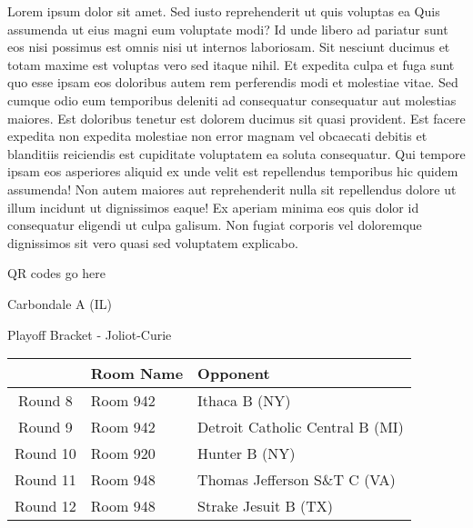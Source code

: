 \documentclass{article}%
\begin{document}
\vspace*{8pt}%
\linebreak%
\newline%
\newline%
Lorem ipsum dolor sit amet. Sed iusto reprehenderit ut quis voluptas ea Quis assumenda ut eius magni eum voluptate modi? Id unde libero ad pariatur sunt eos nisi possimus est omnis nisi ut internos laboriosam. Sit nesciunt ducimus et totam maxime est voluptas vero sed itaque nihil. Et expedita culpa et fuga sunt quo esse ipsam eos doloribus autem rem perferendis modi et molestiae vitae.\newline%
\newline%
Sed cumque odio eum temporibus deleniti ad consequatur consequatur aut molestias maiores. Est doloribus tenetur est dolorem ducimus sit quasi provident. Est facere expedita non expedita molestiae non error magnam vel obcaecati debitis et blanditiis reiciendis est cupiditate voluptatem ea soluta consequatur. Qui tempore ipsam eos asperiores aliquid ex unde velit est repellendus temporibus hic quidem assumenda!\newline%
\newline%
Non autem maiores aut reprehenderit nulla sit repellendus dolore ut illum incidunt ut dignissimos eaque! Ex aperiam minima eos quis dolor id consequatur eligendi ut culpa galisum. Non fugiat corporis vel doloremque dignissimos sit vero quasi sed voluptatem explicabo.\newline%
\newline%
%
\vspace*{30pt}%
\begin{center}%
\begin{Huge}%
QR codes go here%
\end{Huge}%
\end{center}%
\newpage%
\begin{center}%
\begin{Huge}%
Carbondale A (IL)%
\end{Huge}%
\vspace*{8pt}%
\linebreak%
\begin{Large}%
Playoff Bracket {-} Joliot{-}Curie%
\end{Large}%
\end{center}%
%
\begin{tabularx}{\textwidth}{|c|Y|Y|}%
\hline%
&Room Name&Opponent\\%
\hline%
Round 8&Room 942&Ithaca B (NY)\\%
Round 9&Room 942&Detroit Catholic Central B (MI)\\%
Round 10&Room 920&Hunter B (NY)\\%
Round 11&Room 948&Thomas Jefferson S\&T C (VA)\\%
Round 12&Room 948&Strake Jesuit B (TX)\\%
\hline%
\end{tabularx}%
\end{document}

